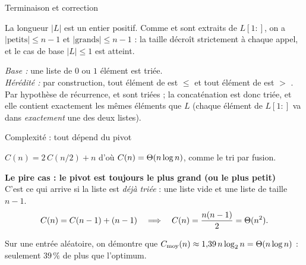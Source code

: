 \documentclass[11pt,aspectratio=169]{beamer}
\begin{document}
\begin{frame}{Terminaison et correction}
\begin{terminaisonrec}
La longueur $|L|$ est un entier positif. Comme  et  sont
extraits de $L[1:]$, on a $|\text{petits}|\le n-1$ et $|\text{grands}|\le n-1$ :
la taille décroît strictement à chaque appel, et le cas de base $|L|\le1$ est atteint.
\end{terminaisonrec}
\vspace{4pt}
\begin{correction}
\small
\emph{Base :} une liste de $0$ ou $1$ élément est triée.\\[2pt]
\emph{Hérédité :} par construction, tout élément de  est $\le$ 
et tout élément de  est $>$ . Par hypothèse de récurrence,
 et  sont triées ; la concaténation
 est donc triée, et elle contient
exactement les mêmes éléments que $L$ (chaque élément de $L[1:]$ va dans
\emph{exactement} une des deux listes).
\end{correction}
\end{frame}

\begin{frame}[shrink=8]{Complexité : tout dépend du pivot}
\begin{encadre}[title=Le meilleur cas : le pivot coupe en deux,fonttitle=\bfseries]
$C(n)=2\,C(n/2)+n$ \; d'où \; $C(n)=\Theta(n\log n)$, comme le tri par fusion.
\end{encadre}
\vspace{4pt}
\begin{attention}
\textbf{Le pire cas : le pivot est toujours le plus grand (ou le plus petit)}\\[3pt]
C'est ce qui arrive si la liste est \emph{déjà triée} : une liste  vide et une liste 
de taille $n-1$.
\[
C(n)=C(n-1)+(n-1)\quad\Longrightarrow\quad C(n)=\frac{n(n-1)}2=\Theta(n^2).
\]
\end{attention}
\vspace{4pt}
\begin{encadre}[title=Le cas moyen,fonttitle=\bfseries]
Sur une entrée aléatoire, on démontre que
$C_{\text{moy}}(n)\approx 1{,}39\,n\log_2 n=\Theta(n\log n)$ :
seulement $39\,\%$ de plus que l'optimum.
\end{encadre}
\end{frame}
\end{document}
